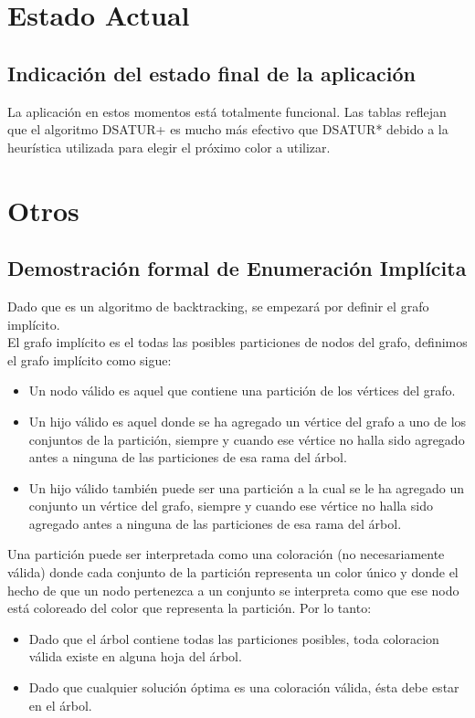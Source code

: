 \documentclass[a4paper,10pt]{article}
\begin{document}
\section{Estado Actual}
\subsection{Indicación del estado final de la aplicación}
La aplicación en estos momentos está totalmente funcional. Las tablas 
reflejan que el algoritmo DSATUR+ es mucho más efectivo que DSATUR* debido 
a la heurística utilizada para elegir el próximo color a utilizar.

\section{Otros}
\subsection{Demostración formal de Enumeración Implícita}
Dado que es un algoritmo de backtracking, se empezar\'a por definir el
grafo impl\'icito.\\
\indent El grafo impl\'icito es el todas las posibles particiones de
nodos del grafo, definimos el grafo impl\'icito como sigue:
\begin{itemize}
 \item Un nodo v\'alido es aquel que contiene una partici\'on de los
       v\'ertices del grafo. 
 \item Un hijo v\'alido es aquel donde se ha agregado un v\'ertice del
       grafo a uno de los conjuntos de la partici\'on, siempre y cuando
       ese v\'ertice no halla sido agregado antes a ninguna de las
       particiones de esa rama del \'arbol.
 \item Un hijo v\'alido tambi\'en puede ser una partici\'on a la cual se
       le ha agregado un conjunto un v\'ertice del grafo, siempre y
       cuando ese v\'ertice no halla sido agregado antes a ninguna de
       las particiones de esa rama del \'arbol.
\end{itemize}
\indent Una partici\'on puede ser interpretada como una coloraci\'on (no
necesariamente v\'alida) donde cada conjunto de la partici\'on
representa un color \'unico y donde el hecho de que un nodo pertenezca a
un conjunto se interpreta como que ese nodo est\'a coloreado del color
que representa la partici\'on.
Por lo tanto:
\begin{itemize}
 \item Dado que el \'arbol contiene todas las particiones posibles,
 toda coloracion v\'alida existe en alguna hoja del \'arbol.
 \item Dado que cualquier soluci\'on \'optima es una coloraci\'on
 v\'alida, \'esta debe estar en el \'arbol.
\end{itemize}
\end{document}
